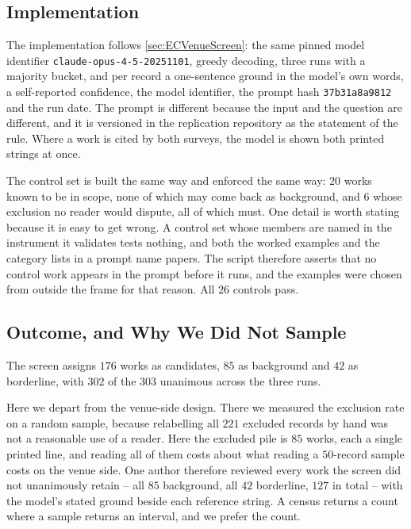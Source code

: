 \subsection{Implementation}

The implementation follows \cref{sec:ECVenueScreen}: the same pinned model identifier
\texttt{claude-opus-4-5-20251101}, greedy decoding, three runs with a majority bucket, and per
record a one-sentence ground in the model's own words, a self-reported confidence, the model
identifier, the prompt hash \texttt{37b31a8a9812} and the run date. The prompt is different because
the input and the question are different, and it is versioned in the replication repository as the
statement of the rule. Where a work is cited by both surveys, the model is shown both printed
strings at once.

The control set is built the same way and enforced the same way: \(20\) works known to be in scope,
none of which may come back as background, and \(6\) whose exclusion no reader would dispute, all of
which must. One detail is worth stating because it is easy to get wrong. A control set whose members
are named in the instrument it validates tests nothing, and both the worked examples and the
category lists in a prompt name papers. The script therefore asserts that no control work appears in
the prompt before it runs, and the examples were chosen from outside the frame for that reason. All
\(26\) controls pass.

\subsection{Outcome, and Why We Did Not Sample}

The screen assigns \(176\) works as candidates, \(85\) as background and \(42\) as borderline, with
\(302\) of the \(303\) unanimous across the three runs.

Here we depart from the venue-side design. There we measured the exclusion rate on a random sample,
because relabelling all \(221\) excluded records by hand was not a reasonable use of a reader.
Here the excluded pile is \(85\) works, each a single printed line, and reading all of them costs
about what reading a \(50\)-record sample costs on the venue side. One author therefore reviewed
every work the screen did not unanimously retain -- all \(85\) background, all \(42\) borderline,
\(127\) in total -- with the model's stated ground beside each reference string. A census returns a
count where a sample returns an interval, and we prefer the count.

